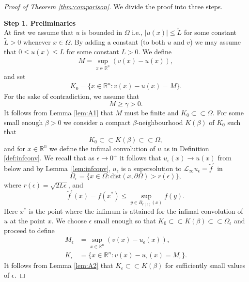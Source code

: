 \documentclass[11pt]{article}
\newcommand{\dist}{\mathrm{dist}}
\providecommand{\Linf}{\mathcal{L}_{\infty}}
\providecommand{\Rn}{\mathbb{R}^n}
\newcommand{\wt}{\widetilde}
\numberwithin{equation}{section}
\theoremstyle{definition}
\begin{document}
\begin{proof}[Proof of Theorem \ref{thm:comparison}] We divide the proof into three steps.

\textbf{Step 1. Preliminaries} \\
At first we assume that $u$ is bounded in $\Omega$ i.e., $|u(x)| \leq \wt{L}$ for some constant $\wt{L} > 0$ whenever $x \in \Omega$. By adding a constant (to both $u$ and $v$) we may assume that $0\leq u(x)\leq L$ for some constant $L > 0$. We define
\begin{align*}
    M = \sup_{x \in \Rn} (v(x)-u(x)),
\end{align*}
and set
\begin{align*}
    K_0 = \{x \in \Rn:v(x)-u(x) = M \}.
\end{align*}
For the sake of contradiction, we assume that
\begin{equation}\label{eq:contradiction2}
    M \geq \gamma > 0.
\end{equation}
It follows from Lemma \ref{lem:A1} that $M$ must be finite and $K_0 \subset \subset \Omega$.
For some small enough $\beta>0$ we consider a compact $\beta$-neighbourhood $K(\beta)$ of $K_0$ such that
$$
K_0 \subset \subset K(\beta) \subset \subset \Omega,
$$
and for $x \in \Rn$ we define the infimal convolution of $u$ as in Definition \ref{def:infconv}. We recall that as $\epsilon \to 0^+$ it follows that $u_{\epsilon}(x) \to u(x)$ from below and by Lemma~\ref{lem:infconv}, $u_{\epsilon}$ is a supersolution to $\Linf u_{\epsilon} =  \tilde{f}^{\epsilon}$ in 
$$
\Omega_{\epsilon} = \{x \in \Omega:\dist(x, \partial \Omega) > r(\epsilon) \},
$$
where $r(\epsilon) = \sqrt{2L\epsilon}$, and 
$$
 \tilde{f}^{\epsilon}(x) =  f(x^*) \leq \sup_{y \in B_{r(\epsilon)}(x)} f(y).
$$
Here $x^*$ is the point where the infimum is attained for the infimal convolution of $u$ at the point $x$. We choose $\epsilon$ small enough so that $K_0 \subset \subset K(\beta) \subset \subset \Omega_{\epsilon}$ and proceed to define
\begin{align*}
    M_{\epsilon} &= \sup_{x \in \Rn}(v(x)-u_{\epsilon}(x)) , \\
    K_{\epsilon} &= \{x \in \Rn  :v(x)-u_{\epsilon}(x) = M_{\epsilon} \}.
\end{align*}
It follows from Lemma \ref{lem:A2} that $K_{\epsilon} \subset \subset K(\beta)$ for sufficiently small values of $\epsilon$.


\end{proof}
\end{document}
